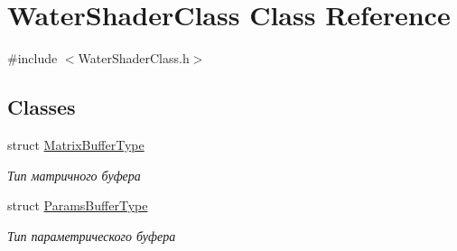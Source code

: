 \hypertarget{class_water_shader_class}{}\section{Water\+Shader\+Class Class Reference}
\label{class_water_shader_class}


{\ttfamily \#include $<$Water\+Shader\+Class.\+h$>$}

\subsection*{Classes}
\begin{DoxyCompactItemize}
\item 
struct \hyperlink{struct_water_shader_class_1_1_matrix_buffer_type}{Matrix\+Buffer\+Type}
\begin{DoxyCompactList}\small\item\em Тип матричного буфера \end{DoxyCompactList}\item 
struct \hyperlink{struct_water_shader_class_1_1_params_buffer_type}{Params\+Buffer\+Type}
\begin{DoxyCompactList}\small\item\em Тип параметрического буфера \end{DoxyCompactList}\end{DoxyCompactItemize}
